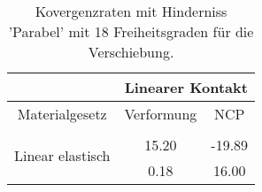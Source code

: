 \begin{table} 
\centering 
\begin{tabular}{c|cc|} 
\cline{2-3} 
 & \multicolumn{2}{|c|}{Linearer Kontakt} \\ 
\hline 
\multicolumn{1}{|c|}{Materialgesetz} & \multicolumn{1}{c|}{Verformung} & \multicolumn{1}{c|}{NCP} \\ 
\hline 
\multicolumn{1}{|c|}{\multirow{3}{*}{Linear elastisch}} &\multicolumn{1}{|c|}{} & \multicolumn{1}{|c|}{} \\ 
\multicolumn{1}{|c|}{} & \multicolumn{1}{|c|}{     15.20} & \multicolumn{1}{|c|}{    -19.89} \\ 
\multicolumn{1}{|c|}{} & \multicolumn{1}{|c|}{      0.18} & \multicolumn{1}{|c|}{     16.00} \\ 
\hline 
\end{tabular}\caption{Kovergenzraten mit Hinderniss 'Parabel' mit 18 Freiheitsgraden für die Verschiebung.}\label{tab:Rate_Parabel_level0}
\end{table} 
